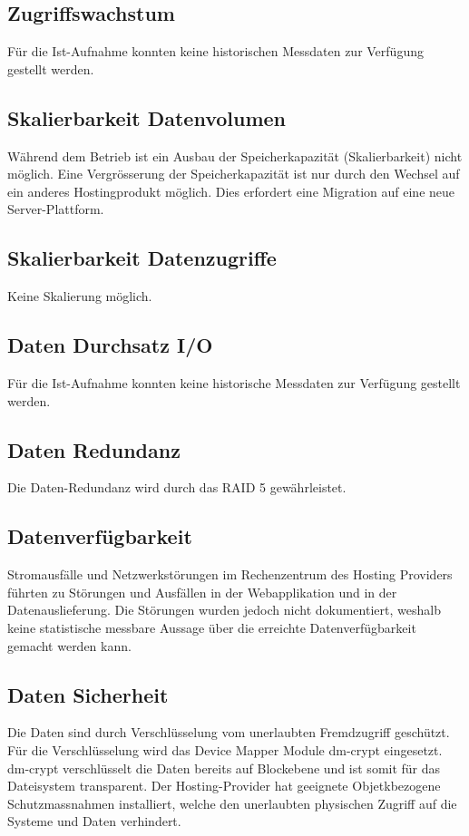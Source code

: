 \subsection{Zugriffswachstum}
Für die Ist-Aufnahme konnten keine historischen Messdaten zur Verfügung gestellt werden.

\subsection{Skalierbarkeit Datenvolumen}
Während dem Betrieb ist ein Ausbau der Speicherkapazität (Skalierbarkeit) nicht möglich. Eine Vergrösserung der Speicherkapazität ist nur durch den Wechsel auf ein anderes Hostingprodukt möglich. Dies erfordert eine Migration auf eine neue Server-Plattform. 

\subsection{Skalierbarkeit Datenzugriffe}
Keine Skalierung möglich. 

\subsection{Daten Durchsatz I/O}
Für die Ist-Aufnahme konnten keine historische Messdaten zur Verfügung gestellt werden.

\subsection{Daten Redundanz}

Die Daten-Redundanz wird durch das RAID 5 gewährleistet.

\subsection{Datenverfügbarkeit}
Stromausfälle und Netzwerkstörungen im Rechenzentrum des Hosting Providers führten zu Störungen und Ausfällen in der Webapplikation und in der Datenauslieferung. Die Störungen wurden jedoch nicht dokumentiert, weshalb keine statistische messbare Aussage über die erreichte Datenverfügbarkeit gemacht werden kann.

\subsection{Daten Sicherheit}
Die Daten sind durch Verschlüsselung vom unerlaubten Fremdzugriff geschützt. Für die Verschlüsselung wird das Device Mapper Module dm-crypt eingesetzt. dm-crypt verschlüsselt die Daten bereits auf Blockebene und ist somit für das Dateisystem transparent.
Der Hosting-Provider hat geeignete Objetkbezogene Schutzmassnahmen installiert, welche den unerlaubten physischen Zugriff auf die Systeme und Daten verhindert.

